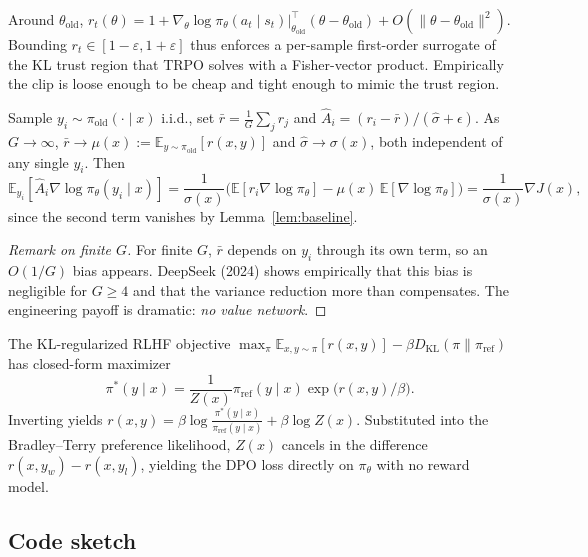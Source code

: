 \begin{proposition}
Around $\theta_{\mathrm{old}}$, $r_t(\theta)=1+\nabla_\theta\log\pi_\theta(a_t\mid s_t)\big|_{\theta_{\mathrm{old}}}^{\top}(\theta-\theta_{\mathrm{old}})+O(\|\theta-\theta_{\mathrm{old}}\|^2)$. Bounding $r_t\in[1-\varepsilon,1+\varepsilon]$ thus enforces a per-sample first-order surrogate of the KL trust region that TRPO solves with a Fisher-vector product. Empirically the clip is loose enough to be cheap and tight enough to mimic the trust region.
\end{proposition}

\begin{theorem}
Sample $y_i\sim\pi_{\mathrm{old}}(\cdot\mid x)$ i.i.d., set $\bar r=\tfrac{1}{G}\sum_j r_j$ and $\hat A_i=(r_i-\bar r)/(\hat\sigma+\epsilon)$. As $G\to\infty$, $\bar r\to\mu(x):=\mathbb{E}_{y\sim\pi_{\mathrm{old}}}[r(x,y)]$ and $\hat\sigma\to\sigma(x)$, both independent of any single $y_i$. Then
\[
\mathbb{E}_{y_i}[\hat A_i\nabla\log\pi_\theta(y_i\mid x)] = \frac{1}{\sigma(x)}\bigl(\mathbb{E}[r_i\nabla\log\pi_\theta]-\mu(x)\,\mathbb{E}[\nabla\log\pi_\theta]\bigr) = \frac{1}{\sigma(x)}\nabla J(x),
\]
since the second term vanishes by Lemma~\ref{lem:baseline}.
\end{theorem}

\begin{proof}[Remark on finite $G$]
For finite $G$, $\bar r$ depends on $y_i$ through its own term, so an $O(1/G)$ bias appears. DeepSeek (2024) shows empirically that this bias is negligible for $G\geq 4$ and that the variance reduction more than compensates. The engineering payoff is dramatic: \emph{no value network}.
\end{proof}

\begin{theorem}
The KL-regularized RLHF objective $\max_\pi \mathbb{E}_{x,y\sim\pi}[r(x,y)]-\beta D_{\mathrm{KL}}(\pi\|\pi_{\mathrm{ref}})$ has closed-form maximizer
\[
\pi^*(y\mid x)=\frac{1}{Z(x)}\pi_{\mathrm{ref}}(y\mid x)\exp\!\bigl(r(x,y)/\beta\bigr).
\]
Inverting yields $r(x,y)=\beta\log\frac{\pi^*(y\mid x)}{\pi_{\mathrm{ref}}(y\mid x)}+\beta\log Z(x)$. Substituted into the Bradley--Terry preference likelihood, $Z(x)$ cancels in the difference $r(x,y_w)-r(x,y_l)$, yielding the DPO loss directly on $\pi_\theta$ with no reward model.
\end{theorem}

\subsection*{Code sketch}

